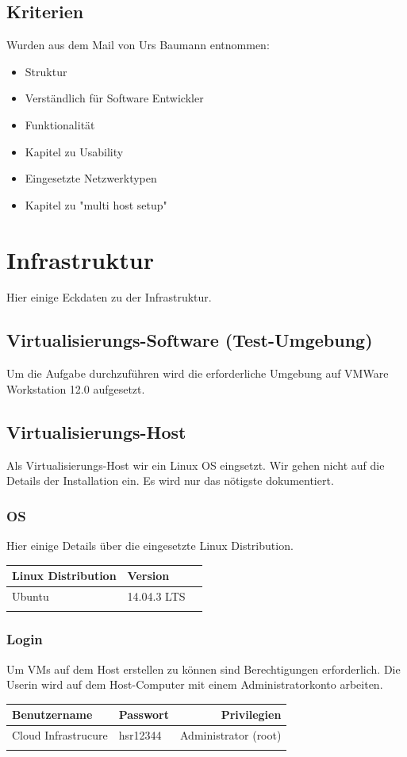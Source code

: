 \documentclass[a4,12pt]{scrartcl}
\begin{document}
\subsection{Kriterien}
Wurden aus dem Mail von Urs Baumann entnommen: 
\begin{itemize}
\item Struktur
\item Verständlich für Software Entwickler
\item Funktionalität 
\item Kapitel zu Usability 
\item Eingesetzte Netzwerktypen 
\item Kapitel zu "multi host setup"  
\end{itemize}
\newpage

\section{Infrastruktur}
Hier einige Eckdaten zu der Infrastruktur. 

\subsection{Virtualisierungs-Software (Test-Umgebung)}
Um die Aufgabe durchzuführen wird die erforderliche Umgebung auf VMWare Workstation 12.0 aufgesetzt. 

\subsection{Virtualisierungs-Host}
Als Virtualisierungs-Host wir ein Linux OS eingsetzt. Wir gehen nicht auf die Details der Installation ein. Es wird nur das nötigste dokumentiert.  

\subsubsection{OS} 
Hier einige Details über die eingesetzte Linux Distribution. 
\begin{center}
    \begin{tabular}{@{} l l r@{}}\toprule    
    {Linux Distribution} & {Version}\\ \midrule
    Ubuntu & 14.04.3 LTS\\ \addlinespace
    \bottomrule
    \end{tabular}
\end{center}

\subsubsection{Login}
Um VMs auf dem Host erstellen zu können sind Berechtigungen erforderlich. Die Userin wird auf dem Host-Computer mit einem Administratorkonto arbeiten. 
\begin{center}
    \begin{tabular}{@{} l l r@{}}\toprule    
    {Benutzername} & {Passwort} & {Privilegien}\\ \midrule
    Cloud Infrastrucure & hsr12344 & Administrator (root)\\ \addlinespace
    \bottomrule
    \end{tabular}
\end{center}
\end{document}
